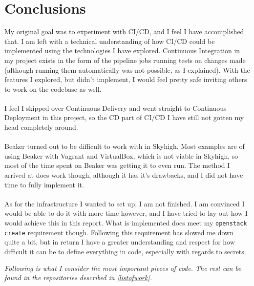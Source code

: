 \section{Conclusions}

My original goal was to experiment with CI/CD, and I feel I have accomplished that. I am left with a technical understanding of how CI/CD could be implemented using the technologies I have explored. Continuous Integration in my project exists in the form of the pipeline jobs running tests on changes made (although running them automatically was not possible, as I explained). With the features I explored, but didn't implement, I would feel pretty safe inviting others to work on the codebase as well. 
\\
\\
I feel I skipped over Continuous Delivery and went straight to Continuous Deployment in this project, so the CD part of CI/CD I have still not gotten my head completely around.
\\
\\
Beaker turned out to be difficult to work with in Skyhigh. Most examples are of using Beaker with Vagrant and VirtualBox, which is not viable in Skyhigh, so most of the time spent on Beaker was getting it to even run. The method I arrived at does work though, although it has it's drawbacks, and I did not have time to fully implement it.
\\
\\
As for the infrastructure I wanted to set up, I am not finished. I am convinced I would be able to do it with more time however, and I have tried to lay out how I would achieve this in this report. What is implemented does meet my \texttt{openstack create} requirement though. Following this requirement has slowed me down quite a bit, but in return I have a greater understanding and respect for how difficult it can be to define everything in code, especially with regards to secrets.



\clearpage %

\nocite{*}



\clearpage %
\appendix

\textit{Following is what I consider the most important pieces of code. The rest can be found in the repositories described in \ref{listofwork}.}

